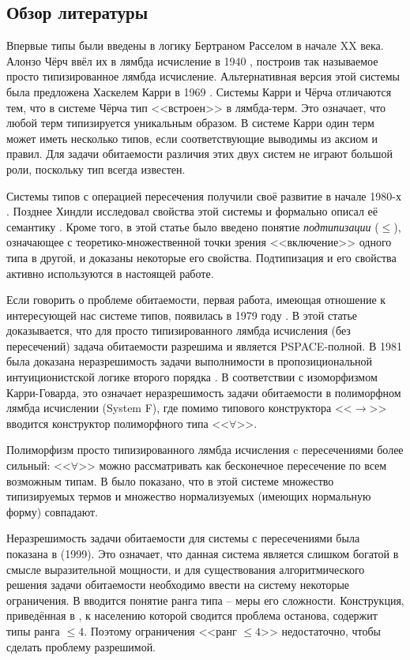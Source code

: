 \documentclass[../main.tex]{subfiles}
\begin{document}
\subsection{Обзор литературы}
Впервые типы были введены в логику Бертраном Расселом в начале XX века. Алонзо Чёрч ввёл их в лямбда исчисление в 1940 \cite{church_1940}, построив так называемое просто типизированное лямбда исчисление. Альтернативная версия этой системы была предложена Хаскелем Карри в 1969 \cite{curry_1969}. Системы Карри и Чёрча отличаются тем, что в системе Чёрча тип <<встроен>> в лямбда-терм. Это означает, что любой терм типизируется уникальным образом. В системе Карри один терм может иметь несколько типов, если соответствующие выводимы из аксиом и правил. Для задачи обитаемости различия этих двух систем не играют большой роли, поскольку тип всегда известен.

Системы типов с операцией пересечения получили своё развитие в начале 1980-х \cite{coppo_1980, coppo_1981}. Позднее Хиндли исследовал свойства этой системы и формально описал её семантику \cite{hindley_1982}. Кроме того, в этой статье было введено понятие {\it подтипизации} ($\leqslant$), означающее с теоретико-множественной точки зрения <<включение>> одного типа в другой, и доказаны некоторые его свойства. Подтипизация и его свойства активно используются в настоящей работе. 

Если говорить о проблеме обитаемости, первая работа, имеющая отношение к интересующей нас системе типов, появилась в 1979 году \cite{statman_1979}. В этой статье доказывается, что для просто типизированного лямбда исчисления (без пересечений) задача обитаемости разрешима и является PSPACE-полной. В 1981 была доказана неразрешимость задачи выполнимости в пропозициональной интуиционистской логике второго порядка \cite{gabbay_1981}. В соответствии с изоморфизмом Карри-Говарда, это означает неразрешимость задачи обитаемости в полиморфном лямбда исчислении (System F), где помимо типового конструктора <<$\to$>> вводится конструктор полиморфного типа <<$\forall$>>.

Полиморфизм просто типизированного лямбда исчисления c пересечениями более сильный: <<$\forall$>> можно рассматривать как бесконечное пересечение по всем возможным типам. В \cite{pottinger_1980} было показано, что в этой системе множество типизируемых термов и множество нормализуемых (имеющих нормальную форму) совпадают. 

Неразрешимость задачи обитаемости для системы с пересечениями была показана в \cite{urzyczyn_1999} (1999). %
Это означает, что данная система является слишком богатой в смысле выразительной мощности, и для существования алгоритмического решения задачи обитаемости необходимо ввести на систему некоторые ограничения. В \cite{leivant_1983} вводится понятие ранга типа -- меры его сложности. Конструкция, приведённая в \cite{urzyczyn_1999}, к населению которой сводится проблема останова, содержит типы ранга $\leqslant 4$. Поэтому ограничения <<ранг $\leqslant 4$>> недостаточно, чтобы сделать проблему разрешимой. 
\end{document}
